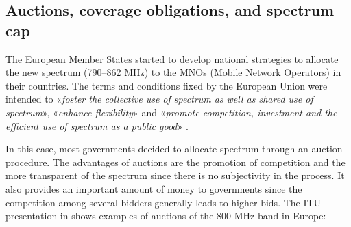 \subsection*{Auctions, coverage obligations, and spectrum cap}
The European Member States started to develop national strategies to allocate the new spectrum (790–862 MHz) to the MNOs (Mobile Network Operators) in their countries. The terms and conditions fixed by the European Union were intended to «\textit{foster the collective use of spectrum as well as shared use of spectrum}», «\textit{enhance flexibility}» and «\textit{promote competition, investment and the efficient use of spectrum as a public good}» \cite{1-06}.\par

In this case, most governments decided to allocate spectrum through an auction procedure. The advantages of auctions are the promotion of competition and the more transparent of the spectrum since there is no subjectivity in the process. It also provides an important amount of money to governments since the competition among several bidders generally leads to higher bids. The ITU presentation in \cite{1-08} shows examples of auctions of the 800 MHz band in Europe:


